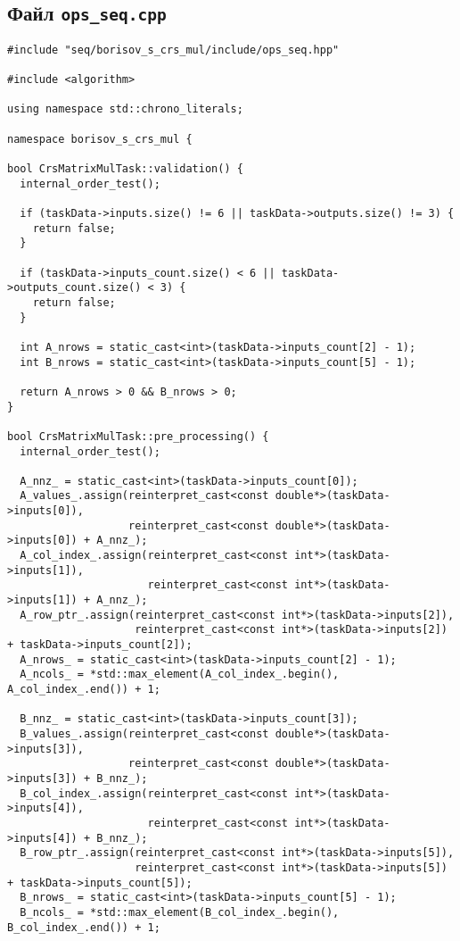 \documentclass[12pt]{article}
\begin{document}
\subsection*{Файл \texttt{ops\_seq.cpp}}

\begin{lstlisting}
#include "seq/borisov_s_crs_mul/include/ops_seq.hpp"

#include <algorithm>

using namespace std::chrono_literals;

namespace borisov_s_crs_mul {

bool CrsMatrixMulTask::validation() {
  internal_order_test();

  if (taskData->inputs.size() != 6 || taskData->outputs.size() != 3) {
    return false;
  }

  if (taskData->inputs_count.size() < 6 || taskData->outputs_count.size() < 3) {
    return false;
  }

  int A_nrows = static_cast<int>(taskData->inputs_count[2] - 1);
  int B_nrows = static_cast<int>(taskData->inputs_count[5] - 1);

  return A_nrows > 0 && B_nrows > 0;
}

bool CrsMatrixMulTask::pre_processing() {
  internal_order_test();

  A_nnz_ = static_cast<int>(taskData->inputs_count[0]);
  A_values_.assign(reinterpret_cast<const double*>(taskData->inputs[0]),
                   reinterpret_cast<const double*>(taskData->inputs[0]) + A_nnz_);
  A_col_index_.assign(reinterpret_cast<const int*>(taskData->inputs[1]),
                      reinterpret_cast<const int*>(taskData->inputs[1]) + A_nnz_);
  A_row_ptr_.assign(reinterpret_cast<const int*>(taskData->inputs[2]),
                    reinterpret_cast<const int*>(taskData->inputs[2]) + taskData->inputs_count[2]);
  A_nrows_ = static_cast<int>(taskData->inputs_count[2] - 1);
  A_ncols_ = *std::max_element(A_col_index_.begin(), A_col_index_.end()) + 1;

  B_nnz_ = static_cast<int>(taskData->inputs_count[3]);
  B_values_.assign(reinterpret_cast<const double*>(taskData->inputs[3]),
                   reinterpret_cast<const double*>(taskData->inputs[3]) + B_nnz_);
  B_col_index_.assign(reinterpret_cast<const int*>(taskData->inputs[4]),
                      reinterpret_cast<const int*>(taskData->inputs[4]) + B_nnz_);
  B_row_ptr_.assign(reinterpret_cast<const int*>(taskData->inputs[5]),
                    reinterpret_cast<const int*>(taskData->inputs[5]) + taskData->inputs_count[5]);
  B_nrows_ = static_cast<int>(taskData->inputs_count[5] - 1);
  B_ncols_ = *std::max_element(B_col_index_.begin(), B_col_index_.end()) + 1;


\end{lstlisting}
\end{document}
